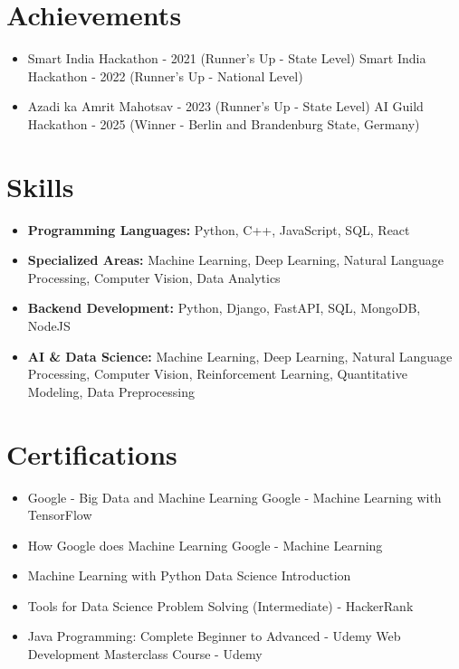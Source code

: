 \documentclass[a4paper,10pt]{article}
\begin{document}
\section*{Achievements}
\begin{itemize}
\item Smart India Hackathon - 2021 (Runner's Up - State Level) \hfill Smart India Hackathon - 2022 (Runner's Up - National Level)
\item Azadi ka Amrit Mahotsav - 2023 (Runner's Up - State Level) \hfill AI Guild Hackathon - 2025 (Winner - Berlin and Brandenburg State, Germany)
\end{itemize}

\section*{Skills}
\begin{itemize}
  \item \textbf{Programming Languages:} Python, C++, JavaScript, SQL, React
  \item \textbf{Specialized Areas:} Machine Learning, Deep Learning, Natural Language Processing, Computer Vision, Data Analytics
  \item \textbf{Backend Development:} Python, Django, FastAPI, SQL, MongoDB, NodeJS
  \item \textbf{AI \& Data Science:} Machine Learning, Deep Learning, Natural Language Processing, Computer Vision, Reinforcement Learning, Quantitative Modeling, Data Preprocessing
\end{itemize}

\section*{Certifications}
\begin{itemize}
\item Google - Big Data and Machine Learning \hfill Google - Machine Learning with TensorFlow
\item How Google does Machine Learning \hfill Google - Machine Learning
\item Machine Learning with Python \hfill Data Science Introduction
\item Tools for Data Science \hfill Problem Solving (Intermediate) - HackerRank
\item Java Programming: Complete Beginner to Advanced - Udemy \hfill Web Development Masterclass Course - Udemy
\end{itemize}
\end{document}

